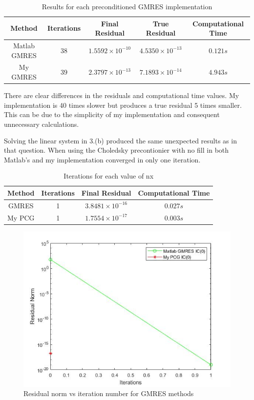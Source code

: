 \documentclass[a4paper, 11pt]{article}
\begin{document}
			\begin{table}[H]
				\centering
				\begin{tabular}{c|c|c|c|c}
					\textbf{Method} &  \textbf{Iterations} 	& \textbf{Final Residual} 	 & \textbf{True Residual}		& \textbf{Computational Time} 	\\ \hline
					Matlab GMRES	& 			$38$ 		& $ 1.5592 \times 10^{-10} $ & $ 4.5350 \times 10^{-13} $	& $ 0.121 s $	\\ \hline
					My GMRES		& 			$39$ 		& $ 2.3797 \times 10^{-13} $ & $ 7.1893 \times 10^{-14} $	& $ 4.943 s $	\\ 
				\end{tabular}
				\caption{Results for each preconditioned GMRES implementation}
				\label{table:ex6}
			\end{table}
			
			There are clear differences in the residuals and computational time values.
			My implementation is 40 times slower but produces a true residual 5 times smaller.
			This can be due to the simplicity of my implementation and consequent unnecessary calculations.		
		
		
			Solving the linear system in 3.(b) produced the same unexpected results as in that question.
			When using the Choledsky precontionier with no fill in both Matlab's and my implementation converged in only one iteration.
			
			\begin{table}[H]
				\centering
				\begin{tabular}{c|c|c|c}
					\textbf{Method} &  \textbf{Iterations} 	& \textbf{Final Residual} 		& \textbf{Computational Time} 	\\ \hline
					GMRES 			& 			1 			& $ 3.8481 \times 10^{-16} $	& $ 0.027 s $	\\ \hline	
					My PCG 			& 			1			& $ 1.7554 \times 10^{-17} $	& $ 0.003 s $	\\
				\end{tabular}
				\caption{Iterations for each value of nx}
				\label{table:ex6_c_prec}
			\end{table}	
			\begin{figure}[H]
				\centering
				\includegraphics[width=.6\linewidth]{ex6b_prec.jpg}
				\caption{Residual norm vs iteration number for GMRES methods}
				\label{fig:ex6_c_prec}
			\end{figure}
			
\end{document}
